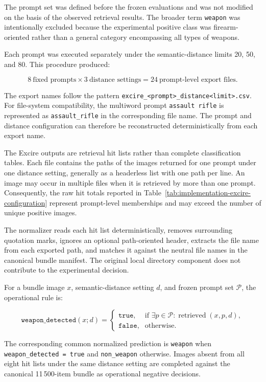 The prompt set was defined before the frozen evaluations and was not modified
on the basis of the observed retrieval results. The broader term
\texttt{weapon} was intentionally excluded because the experimental positive
class was firearm-oriented rather than a general category encompassing all
types of weapons.

Each prompt was executed separately under the semantic-distance limits 20, 50,
and 80. This procedure produced:

\begin{equation}
8\ \text{fixed prompts}
\times
3\ \text{distance settings}
=
24\ \text{prompt-level export files}.
\end{equation}

The export names follow the pattern
\texttt{excire\_<prompt>\_distance<limit>.csv}. For file-system
compatibility, the multiword prompt \texttt{assault rifle} is represented as
\texttt{assault\_rifle} in the corresponding file name. The prompt and
distance configuration can therefore be reconstructed deterministically from
each export name.

The Excire outputs are retrieval hit lists rather than complete classification
tables. Each file contains the paths of the images returned for one prompt
under one distance setting, generally as a headerless list with one path per
line. An image may occur in multiple files when it is retrieved by more than
one prompt. Consequently, the raw hit totals reported in
Table~\ref{tab:implementation-excire-configuration} represent prompt-level
memberships and may exceed the number of unique positive images.

The normalizer reads each hit list deterministically, removes surrounding
quotation marks, ignores an optional path-oriented header, extracts the file
name from each exported path, and matches it against the neutral file names in
the canonical bundle manifest. The original local directory component does not
contribute to the experimental decision.

For a bundle image \(x\), semantic-distance setting \(d\), and frozen prompt
set \(\mathcal{P}\), the operational rule is:

\[
\texttt{weapon\_detected}(x;d)
=
\begin{cases}
\texttt{true},
&
\text{if }
\exists p \in \mathcal{P}:
\operatorname{retrieved}(x,p,d),
\\
\texttt{false},
&
\text{otherwise}.
\end{cases}
\]

The corresponding common normalized prediction is \texttt{weapon} when
\texttt{weapon\_detected = true} and \texttt{non\_weapon} otherwise.
Images absent from all eight hit lists under the same distance setting are
completed against the canonical 11\,500-item bundle as operational negative
decisions.

